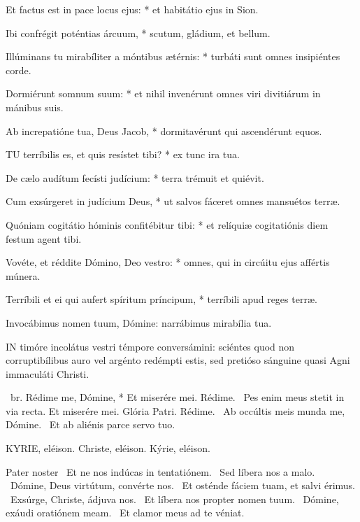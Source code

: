 Et factus est in pace locus ejus: * et habitátio ejus in Sion.

Ibi confrégit poténtias árcuum, * scutum, gládium, et bellum.

Illúminans tu mirabíliter a móntibus ætérnis: * turbáti sunt omnes insipiéntes corde.

Dormiérunt somnum suum: * et nihil invenérunt omnes viri divitiárum in mánibus suis.

Ab increpatióne tua, Deus Jacob, * dormitavérunt qui ascendérunt equos.


\lettrine[lines=2]{T}{U} terríbilis es, et quis resístet tibi? * ex tunc ira tua.

De cælo audítum fecísti judícium: * terra trémuit et quiévit.

Cum exsúrgeret in judícium Deus, * ut salvos fáceret omnes mansuétos terræ.

Quóniam cogitátio hóminis confitébitur tibi: * et relíquiæ cogitatiónis diem festum agent tibi.

Vovéte, et réddite Dómino, Deo vestro: * omnes, qui in circúitu ejus affértis múnera.

Terríbili et ei qui aufert spíritum príncipum, * terríbili apud reges terræ.

 Invocábimus nomen tuum, Dómine: narrábimus mirabília tua.



\lettrine[lines=2]{I}{N} timóre incolátus vestri témpore conversámini: sciéntes quod non corruptibílibus auro vel argénto redémpti estis, sed pretióso sánguine quasi Agni immaculáti Christi.

\R\ br. Rédime me, Dómine, * Et miserére mei. Rédime. \V\ Pes enim meus stetit in via recta. Et miserére mei. Glória Patri. Rédime. \V\ Ab occúltis meis munda me, Dómine. \R\ Et ab aliénis parce servo tuo.



KYRIE, eléison. Christe, eléison. Kýrie, eléison.

Pater noster  \V\ Et ne nos indúcas in tentatiónem. \R\ Sed líbera nos a malo. \V\ Dómine, Deus virtútum, convérte nos. \R\ Et osténde fáciem tuam, et salvi érimus. \V\ Exsúrge, Christe, ádjuva nos. \R\ Et líbera nos propter nomen tuum. \V\ Dómine, exáudi oratiónem meam. \R\ Et clamor meus ad te véniat.

